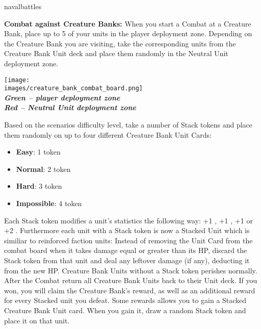 \begin{expansion}{navalbattles}
\begin{multicols*}{2}
  \textbf{Combat against Creature Banks:} When you start a Combat at a Creature Bank, place up to 5 of your units in the player deployment zone.
  Depending on the Creature Bank you are visiting, take the corresponding units from the Creature Bank Unit deck and place them randomly in the Neutral Unit deployment zone.

  \bigskip
  \begin{center}
    \texttt{[image: \\images/creature\_bank\_combat\_board.png]}\\
    \textbf{\footnotesize\textit{\textcolor{darkcandyapplered}{Green -- player deployment zone}}}\\
    \textbf{\footnotesize\textit{\textcolor{darkcandyapplered}{Red -- Neutral Unit deployment zone}}}\\
  \end{center}
  \bigskip

  Based on the scenarios difficulty level, take a number of Stack tokens and place them randomly on up to four different Creature Bank Unit Cards:
  \begin{itemize}
    \item \textbf{Easy}: 1 token
    \item \textbf{Normal}: 2 token
    \item \textbf{Hard}: 3 token
    \item \textbf{Impossible}: 4 token
  \end{itemize}

  Each Stack token modifies a unit's statistics the following way: +1 , +1 , +1  or +2 .
  Furthermore each unit with a Stack token is now a Stacked Unit which is similiar to reinforced faction units: Instead of removing the Unit Card from the combat board when it takes damage equal or greater than its HP, discard the Stack token from that unit and deal any leftover damage (if any), deducting it from the new HP.
  Creature Bank Units without a Stack token perishes normally.
  After the Combat return all Creature Bank Units back to their Unit deck.
  If you won, you will claim the Creature Bank's reward, as well as an additional reward for every Stacked unit you defeat.
  Some rewards allows you to gain a Stacked Creature Bank Unit card.
  When you gain it, draw a random Stack token and place it on that unit.
  \end{multicols*}
\end{expansion}

